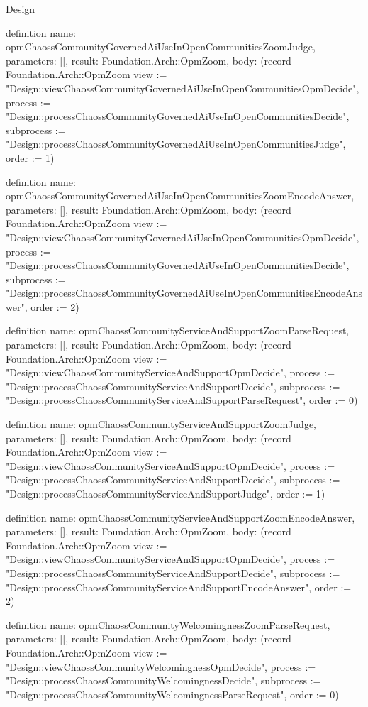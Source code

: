 \begin{lexlean}{Design}
\begin{semanticmodule}
definition{
  name: opmChaossCommunityGovernedAiUseInOpenCommunitiesZoomJudge,
  parameters: [],
  result: Foundation.Arch::OpmZoom,
  body: (record Foundation.Arch::OpmZoom {view := "Design::viewChaossCommunityGovernedAiUseInOpenCommunitiesOpmDecide", process := "Design::processChaossCommunityGovernedAiUseInOpenCommunitiesDecide", subprocess := "Design::processChaossCommunityGovernedAiUseInOpenCommunitiesJudge", order := 1})
}

definition{
  name: opmChaossCommunityGovernedAiUseInOpenCommunitiesZoomEncodeAnswer,
  parameters: [],
  result: Foundation.Arch::OpmZoom,
  body: (record Foundation.Arch::OpmZoom {view := "Design::viewChaossCommunityGovernedAiUseInOpenCommunitiesOpmDecide", process := "Design::processChaossCommunityGovernedAiUseInOpenCommunitiesDecide", subprocess := "Design::processChaossCommunityGovernedAiUseInOpenCommunitiesEncodeAnswer", order := 2})
}

definition{
  name: opmChaossCommunityServiceAndSupportZoomParseRequest,
  parameters: [],
  result: Foundation.Arch::OpmZoom,
  body: (record Foundation.Arch::OpmZoom {view := "Design::viewChaossCommunityServiceAndSupportOpmDecide", process := "Design::processChaossCommunityServiceAndSupportDecide", subprocess := "Design::processChaossCommunityServiceAndSupportParseRequest", order := 0})
}

definition{
  name: opmChaossCommunityServiceAndSupportZoomJudge,
  parameters: [],
  result: Foundation.Arch::OpmZoom,
  body: (record Foundation.Arch::OpmZoom {view := "Design::viewChaossCommunityServiceAndSupportOpmDecide", process := "Design::processChaossCommunityServiceAndSupportDecide", subprocess := "Design::processChaossCommunityServiceAndSupportJudge", order := 1})
}

definition{
  name: opmChaossCommunityServiceAndSupportZoomEncodeAnswer,
  parameters: [],
  result: Foundation.Arch::OpmZoom,
  body: (record Foundation.Arch::OpmZoom {view := "Design::viewChaossCommunityServiceAndSupportOpmDecide", process := "Design::processChaossCommunityServiceAndSupportDecide", subprocess := "Design::processChaossCommunityServiceAndSupportEncodeAnswer", order := 2})
}

definition{
  name: opmChaossCommunityWelcomingnessZoomParseRequest,
  parameters: [],
  result: Foundation.Arch::OpmZoom,
  body: (record Foundation.Arch::OpmZoom {view := "Design::viewChaossCommunityWelcomingnessOpmDecide", process := "Design::processChaossCommunityWelcomingnessDecide", subprocess := "Design::processChaossCommunityWelcomingnessParseRequest", order := 0})
}


\end{semanticmodule}
\end{lexlean}
